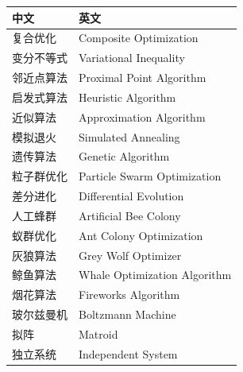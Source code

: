 \begin{table}[htbp]
\centering
\begin{tabular}{@{}ll@{}}
\toprule
\textbf{中文} & \textbf{英文} \\
\midrule
复合优化 & Composite Optimization \\
变分不等式 & Variational Inequality \\
邻近点算法 & Proximal Point Algorithm \\
启发式算法 & Heuristic Algorithm \\
近似算法 & Approximation Algorithm \\
模拟退火 & Simulated Annealing \\
遗传算法 & Genetic Algorithm \\
粒子群优化 & Particle Swarm Optimization \\
差分进化 & Differential Evolution \\
人工蜂群 & Artificial Bee Colony \\
蚁群优化 & Ant Colony Optimization \\
灰狼算法 & Grey Wolf Optimizer \\
鲸鱼算法 & Whale Optimization Algorithm \\
烟花算法 & Fireworks Algorithm \\
玻尔兹曼机 & Boltzmann Machine \\
拟阵 & Matroid \\
独立系统 & Independent System \\
\bottomrule
\end{tabular}
\end{table}

